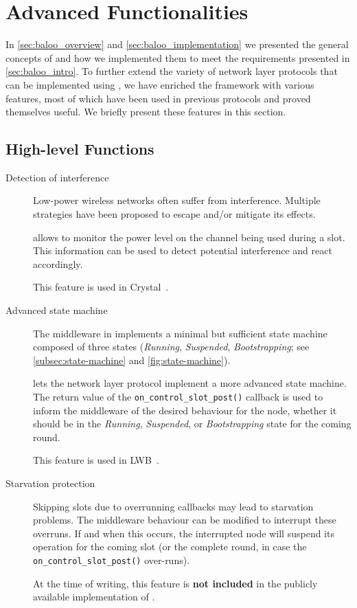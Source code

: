 
\section{Advanced Functionalities}
\label{sec:adv_features}

In \cref{sec:baloo_overview} and \ref{sec:baloo_implementation} we presented the general concepts of \baloo and how we implemented them to meet the requirements presented in \cref{sec:baloo_intro}.
To further extend the variety of network layer protocols that can be implemented using \baloo, we have enriched the framework with various features, most of which have been used in previous protocols and proved themselves useful.
We briefly present these features in this section.

\subsection{High-level Functions}

\label{subsec:add_func}

\begin{description}

	\item [Detection of interference]
	Low-power wireless networks often suffer from interference.
	Multiple strategies have been proposed to escape and/or mitigate its effects.

	\baloo allows to monitor the power level on the channel being used during a slot. This information can be used to detect potential interference and react accordingly.

	This feature is used \eg in Crystal~\cite{istomin2018Interferenceresilient}.

	\item [Advanced state machine]
	The middleware in \baloo implements a minimal but sufficient state machine composed of three states (\textsl{Running}, \textsl{Suspended}, \textsl{Bootstrapping}; see \cref{subsec:state-machine} and \cref{fig:state-machine}).

	\baloo lets the network layer protocol implement a more advanced state machine. The return value of the \texttt{on\_control\_slot\_post()} callback is used to inform the middleware of the desired behaviour for the node, \ie whether it should be in the  \textsl{Running}, \textsl{Suspended}, or \textsl{Bootstrapping} state for the coming round.

	This feature is used \eg in LWB~\cite{ferrari2012LWB}.

	\item[Starvation protection]
	Skipping slots due to overrunning callbacks may lead to starvation problems. The middleware behaviour can be modified to interrupt these overruns.
	If and when this occurs, the interrupted node will suspend its operation for the coming slot (or the complete round, in case the \texttt{on\_control\_slot\_post()} over-runs).

	At the time of writing, this feature is \textbf{not included} in the publicly available implementation of \baloo.

\end{description}


